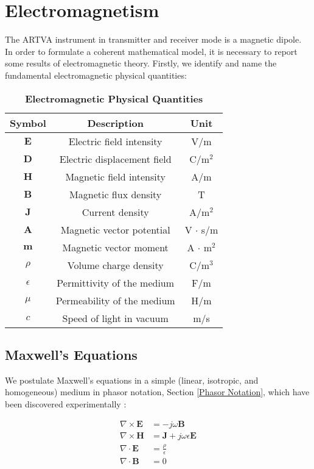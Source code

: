 \documentclass[main]{subfiles}
\begin{document}
\section{Electromagnetism}
The ARTVA instrument in transmitter and receiver 
mode is a magnetic dipole. In order to formulate 
a coherent mathematical model, it is necessary to 
report some results of electromagnetic theory. 
Firstly, we identify and name the fundamental 
electromagnetic physical quantities:
\begin{table}[h!]
    \centering
    \caption{\textbf{Electromagnetic Physical 
 Quantities}}
    \begin{tabular}{ccc}
        \hline\hline
        \textbf{Symbol} & \textbf{Description} & \textbf{Unit} \\
        \hline
        $\mathbf{E}$ & Electric field intensity & V/m \\
        $\mathbf{D}$ & Electric displacement field & C/m$^2$ \\
        $\mathbf{H}$ & Magnetic field intensity & A/m \\
        $\mathbf{B}$ & Magnetic flux density & T \\
        $\mathbf{J}$ & Current density & A/m$^2$ \\
        $\mathbf{A}$ & Magnetic vector potential & V $\cdot$ s/m \\
        $\mathbf{m}$ & Magnetic vector moment & A $\cdot$ m$^2$ \\
        $\rho$ & Volume charge density & C/m$^3$ \\
        $\epsilon$ & Permittivity of the medium & F/m \\
        $\mu$ & Permeability of the medium & H/m \\
        $c$ & Speed of light in vacuum & m/s \\
        \hline\hline
    \end{tabular}
    \label{tab:symbols}
\end{table}

\subsection{Maxwell's Equations}
We postulate Maxwell's equations in a simple 
(linear, isotropic, and homogeneous) medium in 
phasor notation, Section \ref{Phasor Notation}, which have 
been discovered experimentally \cite{book-magnetism}:

\begin{align}
    \nabla \times \mathbf{E} &= -j\omega \mathbf{B} 
    \label{eq:curl_E} \\
    \nabla \times \mathbf{H} &= \mathbf{J} + j\omega 
    \epsilon \mathbf{E} \label{eq:curl_H} \\
    \nabla \cdot \mathbf{E} &= \frac{\rho}{\epsilon} 
    \label{eq:E} \\
    \nabla \cdot \mathbf{B} &= 0 \label{eq:B}
\end{align}
\end{document}
